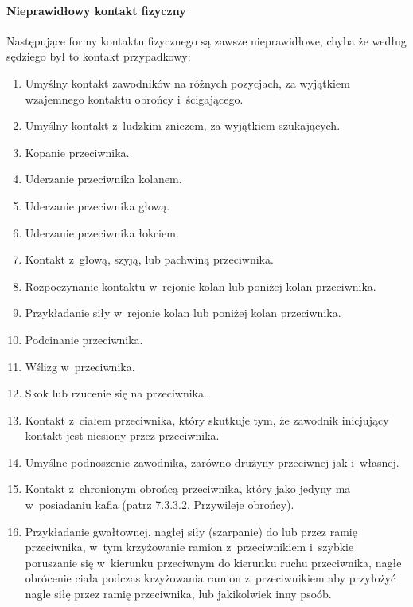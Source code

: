\documentclass[12pt,a4paper]{article}
\begin{document}
\paragraph{Nieprawidłowy kontakt fizyczny}
Następujące formy
kontaktu fizycznego są zawsze nieprawidłowe, chyba że według sędziego
był to kontakt przypadkowy:

\begin{enumerate}
	\item
	      Umyślny kontakt zawodników na różnych pozycjach, za wyjątkiem
	      wzajemnego kontaktu obrońcy i~ścigającego.
	\item
	      Umyślny kontakt z~ludzkim zniczem, za wyjątkiem szukających.
	\item
	      Kopanie przeciwnika.
	\item
	      Uderzanie przeciwnika kolanem.
	\item
	      Uderzanie przeciwnika głową.
	\item
	      Uderzanie przeciwnika łokciem.
	\item
	      Kontakt z~głową, szyją, lub pachwiną przeciwnika.
	\item
	      Rozpoczynanie kontaktu w~rejonie kolan lub poniżej kolan przeciwnika.
	\item
	      Przykładanie siły w~rejonie kolan lub poniżej kolan przeciwnika.
	\item
	      Podcinanie przeciwnika.
	\item
	      Wślizg w~przeciwnika.
	\item
	      Skok lub rzucenie się na przeciwnika.
	\item
	      Kontakt z~ciałem przeciwnika, który skutkuje tym, że zawodnik
	      inicjujący kontakt jest niesiony przez przeciwnika.
	\item
	      Umyślne podnoszenie zawodnika, zarówno drużyny przeciwnej jak i~własnej.
	\item
	      Kontakt z~chronionym obrońcą przeciwnika, który jako jedyny ma w~posiadaniu kafla (patrz 7.3.3.2. Przywileje obrońcy).
	\item
	      Przykładanie gwałtownej, nagłej siły (szarpanie) do lub przez ramię
	      przeciwnika, w~tym krzyżowanie ramion z~przeciwnikiem i~szybkie
	      poruszanie się w~kierunku przeciwnym do kierunku ruchu przeciwnika,
	      nagłe obrócenie ciała podczas krzyżowania ramion z~przeciwnikiem aby
	      przyłożyć nagle siłę przez ramię przeciwnika, lub jakikolwiek inny
	      psoób.
\end{enumerate}
\end{document}
